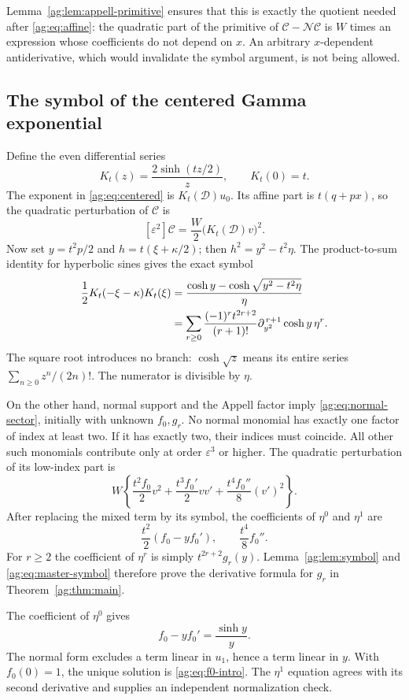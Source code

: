 \documentclass[11pt,letterpaper]{article}
\numberwithin{equation}{section}
\theoremstyle{definition}\newtheorem{definition}[theorem]{Definition}
\theoremstyle{remark}\newtheorem{remark}[theorem]{Remark}
\newcommand{\D}{\mathcal D}\newcommand{\NF}{\mathcal N}\newcommand{\Prim}{\mathcal T}
\newcommand{\piy}{\partial_{y^2}}
\begin{document}
Lemma~\ref{ag:lem:appell-primitive} ensures that this is exactly the
quotient needed after \eqref{ag:eq:affine}: the quadratic part of the
primitive of $\mathcal C-\NF\mathcal C$ is $W$ times an expression
whose coefficients do not depend on $x$. An arbitrary $x$-dependent
antiderivative, which would invalidate the symbol argument, is not
being allowed.

\subsection{The symbol of the centered Gamma exponential}
Define the even differential series
\[
 K_t(z)=\frac{2\sinh(tz/2)}{z},\qquad K_t(0)=t.
\]
The exponent in \eqref{ag:eq:centered} is $K_t(\D)u_0$. Its affine
part is $t(q+px)$, so the quadratic perturbation of $\mathcal C$ is
\begin{equation}\label{ag:eq:quadratic-density}
 [\varepsilon^2]\mathcal C=\frac{W}{2}\bigl(K_t(\D)v\bigr)^2.
\end{equation}
Now set $y=t^2p/2$ and $h=t(\xi+\kappa/2)$; then
$h^2=y^2-t^2\eta$. The product-to-sum identity for hyperbolic sines
gives the exact symbol
\begin{align}
 \frac12K_t(-\xi-\kappa)K_t(\xi)
 &=\frac{\cosh y-\cosh\sqrt{y^2-t^2\eta}}{\eta}\notag\\
 &=\sum_{r\ge0}\frac{(-1)^rt^{2r+2}}{(r+1)!}
           \piy^{\,r+1}\cosh y\,\eta^r.
 \label{ag:eq:master-symbol}
\end{align}
The square root introduces no branch: $\cosh\sqrt z$ means its entire
series $\sum_{n\ge0}z^n/(2n)!$. The numerator is divisible by $\eta$.

On the other hand, normal support and the Appell factor imply
\eqref{ag:eq:normal-sector}, initially with unknown $f_0,g_r$.
No normal monomial has exactly one factor of index at least two.
If it has exactly two, their indices must coincide. All other such
monomials contribute only at order $\varepsilon^3$ or higher.
The quadratic perturbation of its low-index part is
\[
 W\left\{\frac{t^2f_0}{2}v^2+\frac{t^3f_0'}{2}vv'
                         +\frac{t^4f_0''}{8}(v')^2\right\}.
\]
After replacing the mixed term by its symbol, the coefficients of
$\eta^0$ and $\eta^1$ are
\[
 \frac{t^2}{2}(f_0-yf_0'),\qquad \frac{t^4}{8}f_0''.
\]
For $r\ge2$ the coefficient of $\eta^r$ is simply
$t^{2r+2}g_r(y)$. Lemma~\ref{ag:lem:symbol} and
\eqref{ag:eq:master-symbol} therefore prove the derivative formula
for $g_r$ in Theorem~\ref{ag:thm:main}.

The coefficient of $\eta^0$ gives
\begin{equation}\label{ag:eq:f0-ode}
 f_0-yf_0'=\frac{\sinh y}{y}.
\end{equation}
The normal form excludes a term linear in $u_1$, hence a term linear
in $y$. With $f_0(0)=1$, the unique solution is
\eqref{ag:eq:f0-intro}. The $\eta^1$ equation agrees with its second
derivative and supplies an independent normalization check.
\end{document}
